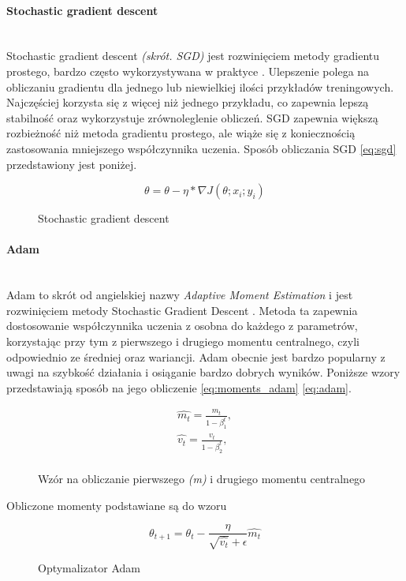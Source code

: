 \paragraph{Stochastic gradient descent} \mbox{}\\
Stochastic gradient descent \textit{(skrót. SGD)} jest rozwinięciem metody gradientu
prostego, bardzo często wykorzystywana w praktyce \cite{OptimizersOverview}.
Ulepszenie polega na obliczaniu gradientu dla jednego lub niewielkiej ilości przykładów
treningowych. Najczęściej korzysta się z więcej niż jednego przykładu, co zapewnia
lepszą stabilność oraz wykorzystuje zrównoleglenie obliczeń. SGD zapewnia większą rozbieżność
niż metoda gradientu prostego, ale wiąże się z koniecznością zastosowania mniejszego
współczynnika uczenia. Sposób obliczania SGD \ref{eq:sgd} przedstawiony jest poniżej.
\begin{figure}[h!]
\renewcommand{\figurename}{Wzór}%
\begin{equation} \label{eq:sgd}
\theta = \theta - \eta * \nabla J(\theta; x_i; y_i)
\end{equation}
\caption{Stochastic gradient descent}
\end{figure}

\paragraph{Adam} \mbox{}\\
Adam to skrót od angielskiej nazwy \textit{Adaptive Moment Estimation} i jest rozwinięciem
metody Stochastic Gradient Descent \cite{AdamOptimizer, OptimizersOverview}.
Metoda ta zapewnia dostosowanie współczynnika uczenia z osobna do każdego z parametrów,
korzystając przy tym z pierwszego i drugiego momentu centralnego, czyli odpowiednio ze
średniej oraz wariancji. Adam obecnie jest bardzo popularny z uwagi na szybkość działania
i osiąganie bardzo dobrych wyników. Poniższe wzory przedstawiają sposób na jego obliczenie \ref{eq:moments_adam} \ref{eq:adam}.
\begin{figure}[h!]
\renewcommand{\figurename}{Wzór}%
\begin{equation} \label{eq:moments_adam}
\begin{align*}
\hat{m_t} = \frac{m_t} {1 - \beta^t_1}, \\
\hat{v_t} = \frac{v_t} {1 - \beta^t_2}, \\
\end{align*}
\end{equation}
\caption{Wzór na obliczanie pierwszego \textit{(m)} i drugiego  momentu centralnego}
\end{figure}
Obliczone momenty podstawiane są do wzoru
\begin{figure}[h!]
\renewcommand{\figurename}{Wzór}%
\begin{equation} \label{eq:adam}
\theta_{t+1} = \theta_t - \frac {\eta} {\sqrt{\hat{v_t}} + \epsilon} \hat{m_t}
\end{equation}
\caption{Optymalizator Adam}
\end{figure}

